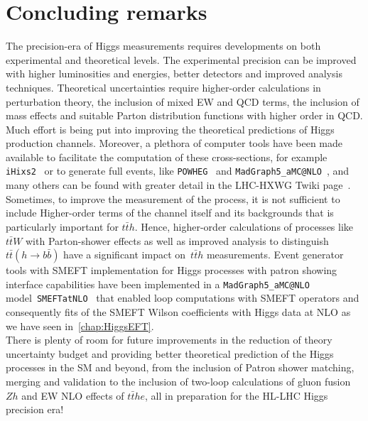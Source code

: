 \section{Concluding remarks \label{sec:singlehiggsconc}  }
The precision-era of Higgs measurements requires developments on both experimental and theoretical levels. The experimental precision can be improved with higher luminosities and energies, better detectors and improved analysis techniques. Theoretical uncertainties require higher-order calculations in perturbation theory, the inclusion of mixed EW and QCD terms, the inclusion of mass effects and suitable Parton distribution functions with higher order in QCD.  Much effort is being put into improving the theoretical predictions of Higgs production channels. Moreover, a plethora of computer tools have been made available to facilitate the computation of these cross-sections, for example  \texttt{iHixs2}~\cite{Dulat:2018rbf} or to generate full events, like \texttt{POWHEG}~\cite{Alioli:2008tz,Nason:2009ai,Bagnaschi:2011tu,Campbell:2012am,Luisoni:2013cuh,Jager:2014vna,Hartanto:2015uka} and \texttt{MadGraph5\_aMC@NLO}~\cite{Alwall:2014hca}, and many others can be found with greater detail in the LHC-HXWG Twiki page~\cite{HXSWG}.  \\ Sometimes, to improve the measurement of the process, it is not sufficient to include Higher-order terms of the channel itself and its backgrounds that is particularly important for $t\bar th $. Hence, higher-order calculations of processes like $t\bar t W$ with Parton-shower effects as well as improved analysis to distinguish $t\bar t(h \to b \bar b) $ have a significant impact on~$t\bar th $ measurements.
Event generator tools with SMEFT implementation for Higgs processes with patron showing interface capabilities have been implemented in a \texttt{MadGraph5\_aMC@NLO} model~\texttt{SMEFTatNLO}~\cite{Degrande:2020evl} that enabled loop computations with SMEFT operators and consequently fits of the SMEFT Wilson coefficients with Higgs data at NLO as we have seen in~\autoref{chap:HiggsEFT}.\\
There is plenty of room for future improvements in the reduction of theory uncertainty budget and providing better theoretical prediction of the Higgs processes in the SM and beyond, from the inclusion of Patron shower matching, merging and validation to the inclusion of two-loop calculations of gluon fusion $Zh$  and EW NLO effects of  $t\bar the $, all in preparation for the HL-LHC Higgs precision era! 



